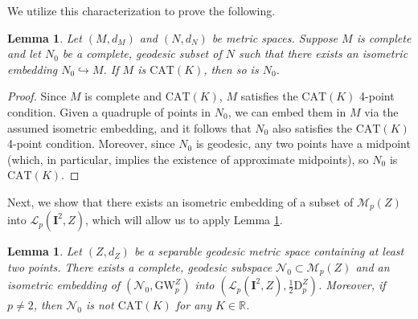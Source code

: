 \documentclass{article}
\newtheorem{lemma}[proposition]{Lemma}
\theoremstyle{definition}
\newcommand{\M}{\mathcal{M}}
\newcommand{\MZp}{\M_p(Z)}
\newcommand{\dgwz}{\mathrm{GW}_p^Z}
\newcommand{\Lp}{\mathcal{L}_p}
\newcommand{\dpz}{\mathrm{D}^Z_p}
\begin{document}
We utilize this characterization to prove the following.

\begin{lemma}\label{lem:isometric_embedding_CAT_K}
    Let $(M, d_M)$ and $(N, d_N)$ be metric spaces. Suppose $M$ is complete and let $N_0$ be a complete, geodesic subset of $N$ such that there exists an isometric embedding $N_0\hookrightarrow M$. If $M$ is $\mathrm{CAT}(K)$, then so is $N_0$.
\end{lemma}

\begin{proof}
        Since $M$ is complete and $\mathrm{CAT}(K)$, $M$ satisfies the $\mathrm{CAT}(K)$ 4-point condition. Given a quadruple of points in $N_0$, we can embed them in $M$ via the assumed isometric embedding, and it follows that $N_0$ also satisfies the $\mathrm{CAT}(K)$ 4-point condition. Moreover, since $N_0$ is geodesic, any two points have a midpoint (which, in particular, implies the existence of approximate midpoints), so $N_0$ is $\mathrm{CAT}(K)$.
\end{proof}

Next, we show that there exists an isometric embedding of a subset of $\MZp$ into $\Lp(\mathbf{I}^2,Z)$, which will allow us to apply Lemma \ref{lem:isometric_embedding_CAT_K}.

\begin{lemma}\label{lem:subset_embedding}
    Let $(Z,d_Z)$ be a separable geodesic metric space containing at least two points. There exists a complete, geodesic subspace $\mathcal{N}_0 \subset \MZp$ and an isometric embedding of  $(\mathcal{N}_0,\dgwz)$ into $(\Lp(\mathbf{I}^2,Z),\frac{1}{2}\dpz)$. Moreover, if \(p\neq 2\), then \(\mathcal{N}_0\) is not \(\mathrm{CAT}(K)\)
    for any \(K\in\mathbb{R}\).
\end{lemma}
\end{document}
